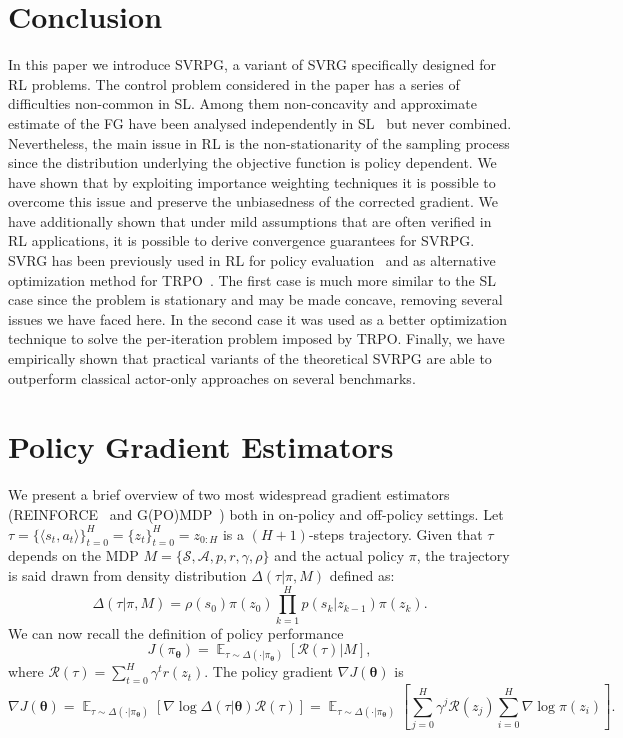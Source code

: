 \documentclass{article}
\makeatletter
\theoremstyle{remark}
\theoremstyle{definition}
\DeclareRobustCommand{\eg}{e.g.,\@\xspace}
\DeclareMathOperator*{\EV}{\mathbb{E}}
\newcommand{\EVV}[2][\ppvect \in \ppspace]{\EV_{#1}\left[{#2}\right]}
\newcommand{\vtheta}{\boldsymbol{\theta}}
\newcommand{\Reward}{\mathcal{R}}
\newcommand{\pol}{\pi_{\vtheta}}
\newcommand{\gradJ}[1]{\nabla J(#1)}
\makeatother
\begin{document}
\section{Conclusion}
In this paper we introduce SVRPG, a variant of SVRG specifically designed for RL problems.
The control problem considered in the paper has a series of difficulties non-common in SL.
Among them non-concavity and approximate estimate of the FG have been analysed independently in SL~\citep[\eg][]{allen2016variance,reddi2016stochastic,harikandeh2015stopwasting} but never combined.
Nevertheless, the main issue in RL is the non-stationarity of the sampling process since the distribution underlying the objective function is policy dependent.
We have shown that by exploiting importance weighting techniques it is possible to overcome this issue and preserve the unbiasedness of the corrected gradient.
We have additionally shown that under mild assumptions that are often verified in RL applications, it is possible to derive convergence guarantees for SVRPG.
SVRG has been previously used in RL for policy evaluation~\citep{du2017svrgpe} and as alternative optimization method for TRPO~\citep{xu2017svrgtrpo}.
The first case is much more similar to the SL case since the problem is stationary and may be made concave, removing several issues we have faced here.
In the second case it was used as a better optimization technique to solve the per-iteration problem imposed by TRPO.
Finally, we have empirically shown that practical variants of the theoretical SVRPG are able to outperform classical actor-only approaches on several benchmarks.







\newpage
\mbox{}
\newpage
\onecolumn
\appendix

\section{Policy Gradient Estimators} \label{A:gradient_estimators}
We present a brief overview of two most widespread gradient estimators (REINFORCE~\citep{williams1992simple} and G(PO)MDP~\citep{baxter2001infinite}) both in on-policy and off-policy settings.
Let $\tau = \{\langle s_t,a_t \rangle\}_{t=0}^{H}= \{z_t\}_{t=0}^{H} = z_{0:H}$ is a $(H+1)$-steps trajectory.
Given that $\tau$ depends on the MDP $M=\{\mathcal{S},\mathcal{A}, p, r, \gamma, \rho\}$ and the actual policy $\pi$, the trajectory is
said drawn from density distribution $\Delta(\tau|\pi,M)$ defined as:
\[
        \Delta(\tau|\pi,M) = \rho(s_0) \pi(z_0) \prod_{k=1}^{H} p(s_k|z_{k-1})\pi(z_k).
\]
We can now recall the definition of policy performance 
\[
        J(\pol) = \EVV[\tau \sim \Delta(\cdot|\pol)]{\Reward(\tau)|M},
\]
where $\Reward(\tau) = \sum_{t=0}^{H}\gamma^t r(z_t)$.
The policy gradient $\nabla J(\vtheta)$ is
\begin{equation}\label{E:onpolicygradient}
        \gradJ{\vtheta} = \EVV[\tau \sim \Delta(\cdot|\pol)]{\nabla \log\Delta(\tau|\vtheta)\Reward(\tau)} = \EVV[\tau \sim \Delta(\cdot|\pol)]{\sum_{j=0}^{H} \gamma^j \mathcal{R}(z_j) \sum_{i=0}^{H} \nabla \log\pi(z_i)}.
\end{equation}
\end{document}
